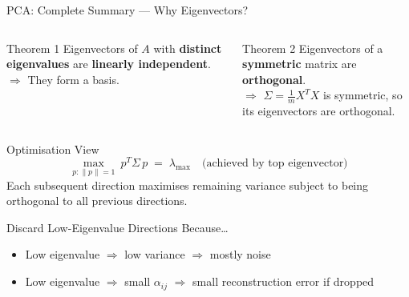 \documentclass{beamer}
\begin{document}
\begin{frame}[shrink=10]{PCA: Complete Summary --- Why Eigenvectors?}
  \begin{columns}[T]
    \begin{block}{Theorem 1}
      Eigenvectors of $A$ with \textbf{distinct eigenvalues} are
      \textbf{linearly independent}.\\[4pt]
      $\Rightarrow$ They form a basis.
    \end{block}

    \begin{block}{Theorem 2}
      Eigenvectors of a \textbf{symmetric} matrix are
      \textbf{orthogonal}.\\[4pt]
      $\Rightarrow$ $\Sigma = \tfrac{1}{m}X^TX$ is symmetric,
      so its eigenvectors are orthogonal.
    \end{block}
  \end{columns}

  \bigskip

  \begin{block}{Optimisation View}
    \[
      \max_{p:\|p\|=1}\ p^T\Sigma\,p \;=\; \lambda_{\max}
      \quad\text{(achieved by top eigenvector)}
    \]
    Each subsequent direction maximises remaining variance subject to
    being orthogonal to all previous directions.
  \end{block}

  \bigskip

  \begin{alertblock}{Discard Low-Eigenvalue Directions Because\ldots}
    \begin{itemize}\setlength\itemsep{4pt}
      \item Low eigenvalue $\Rightarrow$ low variance $\Rightarrow$
            mostly noise
      \item Low eigenvalue $\Rightarrow$ small $\alpha_{ij}$
            $\Rightarrow$ small reconstruction error if dropped
    \end{itemize}
  \end{alertblock}
\end{frame}
\end{document}
